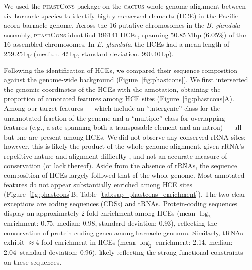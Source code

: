 We used the \textsc{phastCons} package \citep{siepel_evolutionarily_2005} on the
\textsc{cactus} whole-genome alignment \citep{armstrong_progressive_2020} between
six barnacle species to identify highly conserved elements (HCE) in the Pacific
acorn barnacle genome.
Across the 16 putative chromosomes in the \textit{B. glandula} assembly, \textsc{phastCons}
identified \num{196141} HCEs, spanning 50.85\,Mbp (6.05\%) of the 16 assembled chromosomes.
In \textit{B. glandula}, the HCEs had a mean length of 259.25\,bp (median: 42\,bp,
standard deviation: 990.40\,bp).
\vspace{0.1cm}

Following the identification of HCEs, we compared their sequence composition against
the genome-wide background (Figure~\ref{fig:phastcons}).
We first intersected the genomic coordinates of the HCEs with the \bgla{}
annotation, obtaining the proportion of annotated features among HCE sites
(Figure~\ref{fig:phastcons}A). Among our target features — which include an
``intergenic'' class for the unannotated fraction of the genome and a ``multiple''
class for overlapping features (e.g., a site spanning both a transposable element
and an intron) — all but one are present among HCEs. We did not observe any conserved
rRNA sites; however, this is likely the product of the whole-genome alignment, given
rRNA's repetitive nature and alignment difficulty \citep{gillespie_characterizing_2004},
and not an accurate measure of conservation (or lack thereof).
Aside from the absence of rRNAs, the sequence composition of HCEs largely followed that
of the whole genome.
Most annotated features do not appear substantially enriched among HCE sites
(Figure~\ref{fig:phastcons}B; Table~\ref{tab:sup_phastcons_enrichment}).
The two clear exceptions are coding sequences (CDSs) and tRNAs.
Protein-coding sequences display an approximately 2-fold enrichment among HCEs (mean
$\log_2$ enrichment: 0.75, median: 0.98, standard deviation: 0.93), reflecting the
conservation of protein-coding genes among barnacle genomes.
Similarly, tRNAs exhibit $\approx$4-fold enrichment in HCEs (mean $\log_2$ enrichment:
2.14, median: 2.04, standard deviation: 0.96), likely reflecting the strong functional
constraints on these sequences.
\vspace{0.1cm}

